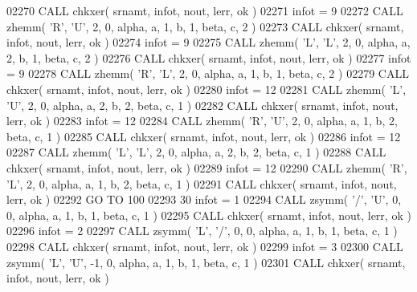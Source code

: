\begin{DoxyCode}
02270       \textcolor{keyword}{CALL }chkxer( srnamt, infot, nout, lerr, ok )
02271       infot = 9
02272       \textcolor{keyword}{CALL }zhemm( \textcolor{stringliteral}{'R'}, \textcolor{stringliteral}{'U'}, 2, 0, alpha, a, 1, b, 1, beta, c, 2 )
02273       \textcolor{keyword}{CALL }chkxer( srnamt, infot, nout, lerr, ok )
02274       infot = 9
02275       \textcolor{keyword}{CALL }zhemm( \textcolor{stringliteral}{'L'}, \textcolor{stringliteral}{'L'}, 2, 0, alpha, a, 2, b, 1, beta, c, 2 )
02276       \textcolor{keyword}{CALL }chkxer( srnamt, infot, nout, lerr, ok )
02277       infot = 9
02278       \textcolor{keyword}{CALL }zhemm( \textcolor{stringliteral}{'R'}, \textcolor{stringliteral}{'L'}, 2, 0, alpha, a, 1, b, 1, beta, c, 2 )
02279       \textcolor{keyword}{CALL }chkxer( srnamt, infot, nout, lerr, ok )
02280       infot = 12
02281       \textcolor{keyword}{CALL }zhemm( \textcolor{stringliteral}{'L'}, \textcolor{stringliteral}{'U'}, 2, 0, alpha, a, 2, b, 2, beta, c, 1 )
02282       \textcolor{keyword}{CALL }chkxer( srnamt, infot, nout, lerr, ok )
02283       infot = 12
02284       \textcolor{keyword}{CALL }zhemm( \textcolor{stringliteral}{'R'}, \textcolor{stringliteral}{'U'}, 2, 0, alpha, a, 1, b, 2, beta, c, 1 )
02285       \textcolor{keyword}{CALL }chkxer( srnamt, infot, nout, lerr, ok )
02286       infot = 12
02287       \textcolor{keyword}{CALL }zhemm( \textcolor{stringliteral}{'L'}, \textcolor{stringliteral}{'L'}, 2, 0, alpha, a, 2, b, 2, beta, c, 1 )
02288       \textcolor{keyword}{CALL }chkxer( srnamt, infot, nout, lerr, ok )
02289       infot = 12
02290       \textcolor{keyword}{CALL }zhemm( \textcolor{stringliteral}{'R'}, \textcolor{stringliteral}{'L'}, 2, 0, alpha, a, 1, b, 2, beta, c, 1 )
02291       \textcolor{keyword}{CALL }chkxer( srnamt, infot, nout, lerr, ok )
02292       \textcolor{keywordflow}{GO TO} 100
02293    30 infot = 1
02294       \textcolor{keyword}{CALL }zsymm( \textcolor{stringliteral}{'/'}, \textcolor{stringliteral}{'U'}, 0, 0, alpha, a, 1, b, 1, beta, c, 1 )
02295       \textcolor{keyword}{CALL }chkxer( srnamt, infot, nout, lerr, ok )
02296       infot = 2
02297       \textcolor{keyword}{CALL }zsymm( \textcolor{stringliteral}{'L'}, \textcolor{stringliteral}{'/'}, 0, 0, alpha, a, 1, b, 1, beta, c, 1 )
02298       \textcolor{keyword}{CALL }chkxer( srnamt, infot, nout, lerr, ok )
02299       infot = 3
02300       \textcolor{keyword}{CALL }zsymm( \textcolor{stringliteral}{'L'}, \textcolor{stringliteral}{'U'}, -1, 0, alpha, a, 1, b, 1, beta, c, 1 )
02301       \textcolor{keyword}{CALL }chkxer( srnamt, infot, nout, lerr, ok )

\end{DoxyCode}
